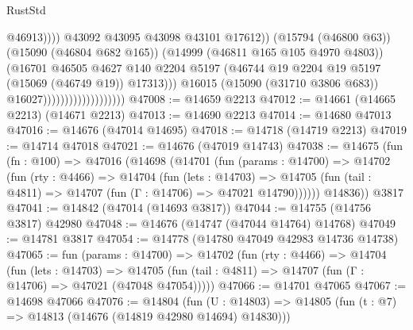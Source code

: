 \begin{lexlean}{RustStd}
\begin{coremodule}
                                                        @46913))))
                                                @43092
                                                @43095
                                                @43098
                                                @43101
                                                @17612))
                                            (@15794 (@46800 @63))
                                            (@15090 (@46804 @682 @165))
                                            (@14999 (@46811 @165 @105 @4970 @4803))
                                            (@16701
                                              @46505
                                              @4627
                                              @140
                                              @2204
                                              @5197
                                              (@46744
                                                @19
                                                @2204
                                                @19
                                                @5197
                                                (@15069 (@46749 @19))
                                                @17313)))
                                          @16015
                                          (@15090 (@31710 @3806 @683))
                                          @16027)))))))))))))))))))
@47008 := @14659 @2213
@47012 := @14661 (@14665 @2213) (@14671 @2213)
@47013 := @14690 @2213
@47014 := @14680 @47013
@47016 := @14676 (@47014 @14695)
@47018 := @14718 (@14719 @2213)
@47019 := @14714 @47018
@47021 := @14676 (@47019 @14743)
@47038 := @14675
    (fun (fn : @100) =>
    @47016
      (@14698
        (@14701
          (fun (params : @14700) =>
          @14702
            (fun (rty : @4466) =>
            @14704
              (fun (lets : @14703) =>
              @14705 (fun (tail : @4811) => @14707 (fun (Γ : @14706) => @47021 @14790))))))
        @14836))
    @3817
@47041 := @14842 (@47014 (@14693 @3817))
@47044 := @14755 (@14756 @3817) @42980
@47048 := @14676 (@14747 (@47044 @14764) @14768)
@47049 := @14781 @3817
@47054 := @14778 (@14780 @47049 @42983 @14736 @14738)
@47065 := fun (params : @14700) =>
  @14702
    (fun (rty : @4466) =>
    @14704
      (fun (lets : @14703) =>
      @14705 (fun (tail : @4811) => @14707 (fun (Γ : @14706) => @47021 (@47048 @47054)))))
@47066 := @14701 @47065
@47067 := @14698 @47066
@47076 := @14804
    (fun (U : @14803) => @14805 (fun (t : @7) => @14813 (@14676 (@14819 @42980 @14694) @14830)))

\end{coremodule}
\end{lexlean}
